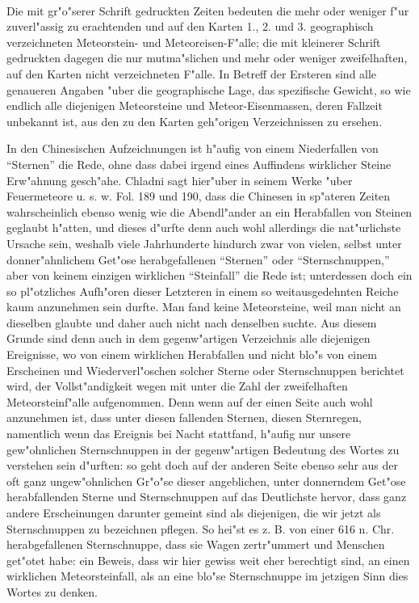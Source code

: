 \documentclass[a4paper, 8pt, oneside, polutonikogreek, german]{article}
\begin{document}
\paragraph{}
Die mit gr"o"serer Schrift gedruckten Zeiten bedeuten die mehr oder weniger f"ur zuverl"assig zu erachtenden und auf den Karten 1., 2. und 3. geographisch verzeichneten Meteorstein- und Meteoreisen-F"alle; die mit kleinerer Schrift gedruckten dagegen die nur mutma"slichen und mehr oder weniger zweifelhaften, auf den Karten nicht verzeichneten F"alle. In Betreff der Ersteren sind alle genaueren Angaben "uber die geographische Lage, das spezifische Gewicht, so wie endlich alle diejenigen Meteorsteine und Meteor-Eisenmassen, deren Fallzeit unbekannt ist, aus den zu den Karten geh"origen Verzeichnissen zu ersehen.

In den Chinesischen Aufzeichnungen ist h"aufig von einem Niederfallen von "`Sternen"' die Rede, ohne dass dabei irgend eines Auffindens wirklicher Steine Erw"ahnung gesch"ahe. Chladni sagt hier"uber in seinem Werke "uber Feuermeteore u. s. w. Fol. 189 und 190, dass die Chinesen in sp"ateren Zeiten wahrscheinlich ebenso wenig wie die Abendl"ander an ein Herabfallen von Steinen geglaubt h"atten, und dieses d"urfte denn auch wohl allerdings die nat"urlichste Ursache sein, weshalb viele Jahrhunderte hindurch zwar von vielen, selbst unter donner"ahnlichem Get"ose herabgefallenen "`Sternen"' oder "`Sternschnuppen,"' aber von keinem einzigen wirklichen "`Steinfall"' die Rede ist; unterdessen doch ein so pl"otzliches Aufh"oren dieser Letzteren in einem so weitausgedehnten Reiche kaum anzunehmen sein durfte. Man fand keine Meteorsteine, weil man nicht an dieselben glaubte und daher auch nicht nach denselben suchte. Aus diesem Grunde sind denn auch in dem gegenw"artigen Verzeichnis alle diejenigen Ereignisse, wo von einem wirklichen Herabfallen und nicht blo"s von einem Erscheinen und Wiederverl"oschen solcher Sterne oder Sternschnuppen berichtet wird, der Vollst"andigkeit wegen mit unter die Zahl der zweifelhaften Meteorsteinf"alle aufgenommen. Denn wenn auf der einen Seite auch wohl anzunehmen ist, dass unter diesen fallenden Sternen, diesen Sternregen, namentlich wenn das Ereignis bei Nacht stattfand, h"aufig nur unsere gew"ohnlichen Sternschnuppen in der gegenw"artigen Bedeutung des Wortes zu verstehen sein d"urften: so geht doch auf der anderen Seite ebenso sehr aus der oft ganz ungew"ohnlichen Gr"o"se dieser angeblichen, unter donnerndem Get"ose herabfallenden Sterne und Sternschnuppen auf das Deutlichste hervor, dass ganz andere Erscheinungen darunter gemeint sind als diejenigen, die wir jetzt als Sternschnuppen zu bezeichnen pflegen. So hei"st es z. B. von einer 616 n. Chr. herabgefallenen Sternschnuppe, dass sie Wagen zertr"ummert und Menschen get"otet habe: ein Beweis, dass wir hier gewiss weit eher berechtigt sind, an einen wirklichen Meteorsteinfall, als an eine blo"se Sternschnuppe im jetzigen Sinn dies Wortes zu denken.
\end{document}
